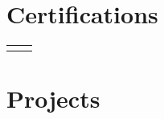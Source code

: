 \documentclass[11pt, letterpaper]{resume}
\begin{document}
\begin{paracol}{2}
\section*{Certifications}
\begin{supertabular}{rl}


\end{supertabular}

\bigskip


\section*{Projects}








\end{paracol}
\end{document}

